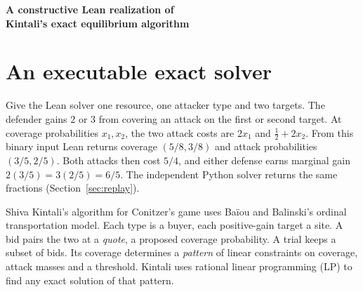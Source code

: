 \documentclass[11pt,letterpaper]{article}
\newcommand*{\manuscriptauthor}{Robert Thomas Collins}
\begin{document}
\begin{center}
  {\LARGE\bfseries A constructive Lean realization of\\[.10em]
    Kintali's exact equilibrium algorithm\par}
  \medskip{\large\manuscriptauthor\par}
\end{center}

\begin{abstract}
We verify in Lean a constructive variant of Shiva Kintali's polynomial-time
equilibrium algorithm for Bayesian simple security games. Kintali solves a linear program
whose constraints come from a quota sweep. Our executable tests the
sweep's allocation and uses a nonsingular integer minor to repair it.
A two-target restriction gives an exactly feasible pattern whose allocation
fails this test. We extend Kintali's fixed witness by at most one bid per
type and active target so that every failure exposes a blocking bid in
that set. To compare contacts, we prove that for stable allocations on
the same retained bids with the same rankings, the $\ell^1$ change in
outside-option and vacancy balances is at most the $\ell^1$ change in
quotas. Lean verifies exact output for every valid rational input and
polynomial measured binary word cost. A polynomial execution bound for
one machine in the public finite-machine model remains open.
\end{abstract}

\section{An executable exact solver}
\label{sec:implementation}

Give the Lean solver one resource, one attacker type and two targets.
The defender gains $2$ or $3$ from covering an attack on the first or
second target. At coverage probabilities $x_1,x_2$, the two attack costs
are $2x_1$ and $\tfrac12+2x_2$. From this binary input Lean returns
coverage $(5/8,3/8)$ and attack probabilities $(3/5,2/5)$. Both attacks
then cost $5/4$, and either defense earns marginal gain $2(3/5)=3(2/5)=6/5$.
The independent Python solver returns the same fractions
(Section~\ref{sec:replay}). \cite{artifact,pythonfollow}

Shiva Kintali's algorithm for Conitzer's game uses Baïou and Balinski's
ordinal transportation model. Each type is a buyer, each positive-gain
target a site. A bid pairs the two at a \emph{quote}, a proposed coverage
probability. A trial keeps a subset of bids. Its coverage determines a
\emph{pattern} of linear constraints on coverage, attack masses and a
threshold. Kintali uses rational linear programming (LP) to find any
exact solution of that pattern.
\cite[Theorem~1 and \S3]{kintali} \cite{conitzer,bb}
\end{document}

